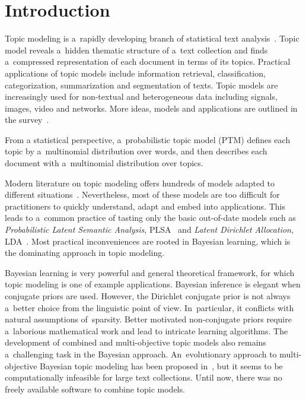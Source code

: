 \documentclass{acm_proc_article-sp}
\begin{document}

\section{Introduction}

Topic modeling is a~rapidly developing branch of statistical text analysis~\cite{blei12ptm}.
Topic model reveals a~hidden thematic structure of a~text collection
and finds a~compressed representation of each document in terms of its topics.
Practical applications of topic models include
information retrieval,
classification, categorization, summarization and segmentation of texts.
Topic models are increasingly used for non-textual and heterogeneous data
including signals, images, video and networks.
More ideas, models and applications are outlined in the survey~\cite{daud10knowledge}.

From a statistical perspective,
a~probabilistic topic model (PTM)
defines each topic by a~multinomial distribution over words,
and then describes each document with a~multinomial distribution over topics.

Modern literature on topic modeling offers
hundreds of models adapted to different situations~\cite{daud10knowledge}.
Nevertheless,
most of these models are too difficult for practitioners
to quickly understand, adapt and embed into applications.
This leads to a~common practice of tasting only the basic out-of-date models such as
\emph{Probabilistic Latent Semantic Analysis}, PLSA~\cite{hofmann99plsi} and
\emph{Latent Dirichlet Allocation}, LDA~\cite{blei03latent}.
Most practical inconveniences are rooted in Bayesian learning,
which is the dominating approach in topic modeling.

Bayesian learning is very powerful and general theoretical framework,
for which topic modeling is one of example applications.
Bayesian inference is elegant when conjugate priors are used.
However, the Dirichlet conjugate prior
is not always a~better choice from the linguistic point of view.
In~particular, it conflicts with natural assumptions of~sparsity.
Better motivated non-conjugate priors
require a~laborious mathematical work and
lead to intricate learning algorithms.
The development of combined and multi-objective topic models also remains a~challenging task in the Bayesian approach.
An~evolutionary approach to multi-objective Bayesian topic modeling has been proposed in~\cite{khalifa13multi},
but it seems to be computationally infeasible for large text collections.
Until now, there was no freely available software to combine topic models.
\end{document}
